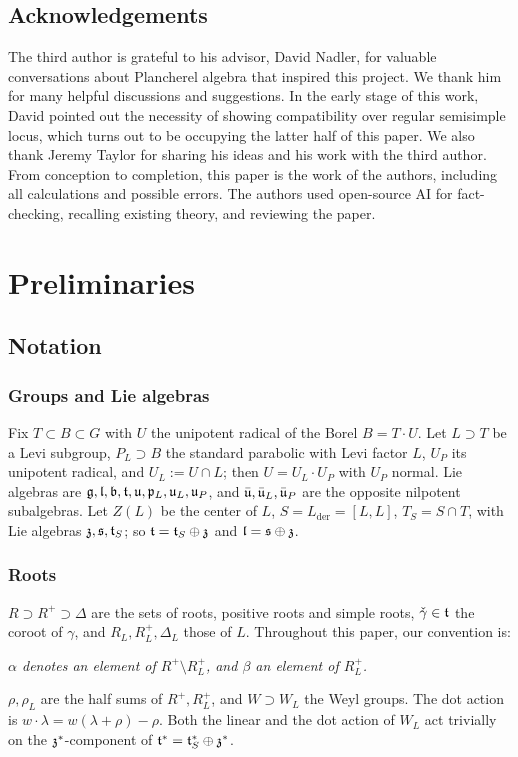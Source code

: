 \documentclass{article}
\theoremstyle{plain}
\theoremstyle{definition}
\theoremstyle{remark}
\numberwithin{equation}{section}
\begin{document}
\subsection*{Acknowledgements}
The third author is grateful to his advisor, David Nadler, for valuable conversations about Plancherel algebra that inspired this project. We thank him for many helpful discussions and suggestions. In the early stage of this work, David pointed out the necessity of showing compatibility over regular semisimple locus, which turns out to be occupying the latter half of this paper. We also thank Jeremy Taylor for sharing his ideas and his work with the third author. From conception to completion, this paper is the work of the authors, including all calculations and possible errors. The authors used open-source AI for fact-checking, recalling existing theory, and reviewing the paper.

\section{Preliminaries}\label{sec:prelim}

\subsection{Notation}\label{sec:notation}

\subsubsection*{Groups and Lie algebras}
Fix $T\subset B\subset G$ with $U$ the unipotent radical of the Borel $B = T\cdot U$. Let $L\supset T$ be a Levi subgroup, $P_L\supset B$ the standard parabolic with Levi factor $L$, $U_P$ its unipotent radical, and $U_L:=U\cap L$; then $U=U_L\cdot U_P$ with $U_P$ normal. Lie algebras are $\mathfrak{g},\mathfrak{l},\mathfrak{b},\mathfrak{t},\mathfrak{u},\mathfrak{p}_L,\mathfrak{u}_L,\mathfrak{u}_P$, and $\bar{\mathfrak{u}},\bar{\mathfrak{u}}_L,\bar{\mathfrak{u}}_P$ are the opposite nilpotent subalgebras. Let $Z(L)$ be the center of $L$, $S = L_{\mathrm{der}}=[L,L]$, $T_S=S\cap T$, with Lie algebras $\mathfrak{z},\mathfrak{s},\mathfrak{t}_S$; so $\mathfrak{t}=\mathfrak{t}_S\oplus\mathfrak{z}$ and $\mathfrak{l}=\mathfrak{s}\oplus\mathfrak{z}$.

\subsubsection*{Roots}
$R\supset R^+\supset\Delta$ are the sets of roots, positive roots and simple roots, $\check\gamma\in\mathfrak{t}$ the coroot of $\gamma$, and $R_L,R_L^+,\Delta_L$ those of $L$. Throughout this paper, our convention is:
\begin{center}
\emph{$\alpha$ denotes an element of $R^+\setminus R^+_L$, and $\beta$ an element of $R^+_L$.}
\end{center}
$\rho,\rho_L$ are the half sums of $R^+,R^+_L$, and $W\supset W_L$ the Weyl groups. The dot action is $w\cdot\lambda=w(\lambda+\rho)-\rho$. Both the linear and the dot action of $W_L$ act trivially on the $\mathfrak{z}^*$-component of $\mathfrak{t}^*=\mathfrak{t}_S^*\oplus\mathfrak{z}^*$.
\end{document}
